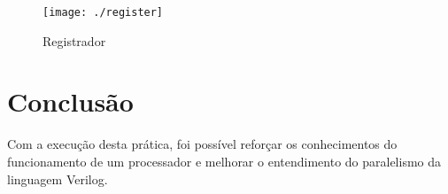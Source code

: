 \documentclass[12pt, a4paper]{article}
\begin{document}
	\begin{figure}[H]
		\centering
		\texttt{[image: ./register]}
		\caption{Registrador}
		\label{fig: register}
	\end{figure}

	\section{Conclusão}
	
	\par Com a execução desta prática, foi possível reforçar os conhecimentos do funcionamento de um processador e melhorar o entendimento do paralelismo da linguagem Verilog.
\end{document}
